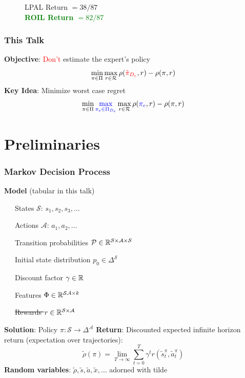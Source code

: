 \documentclass{beamer}
\begin{document}
\begin{frame}
\begin{figure}
\begin{center}
\begin{minipage}{0.45\linewidth}
    LPAL Return $= 38/87$ \\
    \textcolor{green}{\textbf{ROIL Return $= 82/87$}}
  \end{minipage}
  \end{center}
\end{figure}
\end{frame}

\begin{frame}
	\frametitle{This Talk}
	\textbf{Objective}: \textcolor{red}{Don't} estimate the expert's policy
	\[
		\min_{\pi \in \Pi} \max_{r \in \mathcal{R}} \rho(\textcolor{red}{\hat{\pi}_{D_e}}, r) - \rho(\pi, r)
	\]
	\vfill
	\textbf{Key Idea}: Minimize worst case regret
	\[
		\min_{\pi \in \Pi} \textcolor{blue}{\max_{\pi_e \in \Pi_{D_e}}} \max_{r \in \mathcal{R}} \rho(\textcolor{blue}{\pi_e}, r) - \rho(\pi, r)
	\]
\end{frame}

\section*{Preliminaries}

\begin{frame} \frametitle{Markov Decision Process}
  \textbf{Model} (tabular in this talk) \par
    {\small
   ~~~States $\mathcal{S}$: $s_1, s_2, s_3, \dots $ \par
   ~~~Actions $\mathcal{A}$: $a_1, a_2, \dots $ \par
   ~~~Transition probabilities $\mathcal{P} \in \mathbb{R}^{\mathcal{S} \times \mathcal{A} \times \mathcal{S} }$ \par
   ~~~Initial state distribution $p_0 \in \Delta^\mathcal{S}$ \par
   ~~~Discount factor $\gamma \in \mathbb{R}$ \par
   ~~~Features $\Phi \in \mathbb{R}^{\mathcal{S} \mathcal{A} \times k}$ \par
   ~~~\sout{Rewards $r \in \mathbb{R}^{\mathcal{S} \times \mathcal{A}}$}}
    \vfill 
    \textbf{Solution}: Policy ${\pi}\colon \mathcal{S} \to \Delta^\mathcal{A}$
    \vfill
    \textbf{Return}: Discounted expected infinite horizon return (expectation over trajectories):
    \[
	    \tilde{\rho}(\pi) = \lim_{T \to \infty} \sum_{t=0}^T \gamma^t r(\tilde{s}^{\pi}_t, \tilde{a}^{{\pi}}_t)
    \]
    \vfill
    \textbf{Random variables}: $\tilde{\rho}, \tilde{s}, \tilde{a}, \tilde{x}, \dots $ adorned with tilde
\end{frame}
\end{document}
